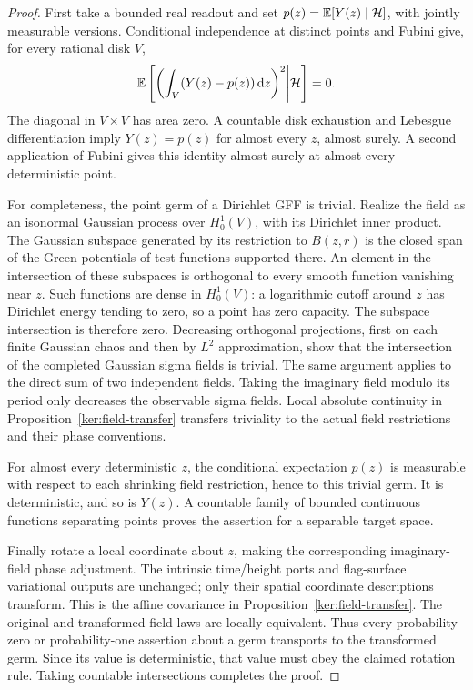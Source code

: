 \begin{proof}
First take a bounded real readout and set
\(p(z)=\mathbb E[Y(z)\mid\mathcal H]\), with jointly measurable versions.
Conditional independence at distinct points and Fubini give, for
every rational disk \(V\),
\[
 \mathbb E\left[\left(\int_V(Y(z)-p(z))\,\mathrm d z\right)^2
              \middle|\mathcal H\right]=0.
\]
The diagonal in \(V\times V\) has area zero.  A countable disk
exhaustion and Lebesgue differentiation imply
\(Y(z)=p(z)\) for almost every \(z\), almost surely.  A second
application of Fubini gives this identity almost surely at almost
every deterministic point.

For completeness, the point germ of a Dirichlet GFF is trivial.
Realize the field as an isonormal Gaussian process over
\(H^1_0(V)\), with its Dirichlet inner product.  The Gaussian
subspace generated by its restriction to \(B(z,r)\) is the closed
span of the Green potentials of test functions supported there.
An element in the intersection of these subspaces is orthogonal to
every smooth function vanishing near \(z\).  Such functions are
dense in \(H^1_0(V)\): a logarithmic cutoff around \(z\) has
Dirichlet energy tending to zero, so a point has zero capacity.
The subspace intersection is therefore zero.  Decreasing orthogonal
projections, first on each finite Gaussian chaos and then by
\(L^2\) approximation, show that the intersection of the completed
Gaussian sigma fields is trivial.  The same argument applies to the
direct sum of two independent fields.  Taking the imaginary field
modulo its period only decreases the observable sigma fields.
Local absolute continuity in Proposition~\ref{ker:field-transfer}
transfers triviality to the actual field restrictions and their phase
conventions.

For almost every deterministic \(z\), the conditional expectation
\(p(z)\) is measurable with respect to each shrinking field
restriction, hence to this trivial germ.  It is deterministic, and
so is \(Y(z)\).  A countable family of bounded continuous functions
separating points proves the assertion for a separable target space.

Finally rotate a local coordinate about \(z\), making the corresponding
imaginary-field phase adjustment.  The intrinsic time/height ports
and flag-surface variational outputs are unchanged; only their
spatial coordinate descriptions transform.  This is the affine
covariance in Proposition~\ref{ker:field-transfer}.  The original
and transformed field laws are locally equivalent.  Thus every
probability-zero or probability-one assertion about a germ transports
to the transformed germ.  Since its value is deterministic, that
value must obey the claimed rotation rule.  Taking countable
intersections completes the proof.
\end{proof}

